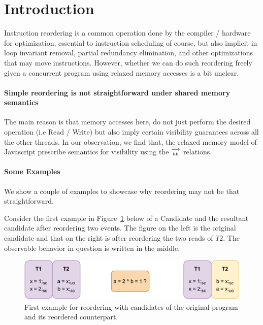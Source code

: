 
\section{Introduction}
    Instruction reordering is a common operation done by the compiler / hardware for optimization, essential to instruction scheduling of course, but also implicit in loop invariant removal, partial redundancy elimination, and other optimizations that may move instructions. 
    However, whether we can do such reordering freely given a concurrent program using relaxed memory accesses is a bit unclear. 
     
    \paragraph{Simple reordering is not straightforward under shared memory semantics}
    The main reason is that memory accesses here, do not just perform the desired operation (i.e Read / Write) but also imply certain visibility guarantees across all the other threads.  
    In our observation, we find that, the relaxed memory model of Javascript prescribe semantics for visibility using the $\stackrel{\longrightarrow}{_{hb}}$ relations. 
    
    \paragraph{Some Examples}

        We show a couple of examples to showcase why reordering may not be that straightforward. 

        Consider the first example in Figure~\ref{reord:example1(a)} below of a Candidate and the resultant candidate after reordering two events.
        The figure on the left is the original candidate and that on the right is after reordering the two reads of $T2$.
        The observable behavior in question is written in the middle. 
        \begin{figure}[H]
            \centering
            \includegraphics[scale=0.7]{5.InstructionReordering/0.Intro/ReorderingExample1(a).pdf}
            \caption{First example for reordering with candidates of the original program and its reordered counterpart.}
            \label{reord:example1(a)} 
        \end{figure}
        
